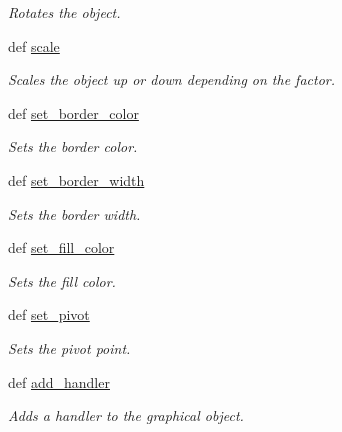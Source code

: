 \begin{DoxyCompactItemize}
\begin{DoxyCompactList}\small\item\em Rotates the object. \item\end{DoxyCompactList}\item 
def \hyperlink{classcs110graphics_1_1Fillable_a80d5b6b6d2ebae867dccecb803075749}{scale}
\begin{DoxyCompactList}\small\item\em Scales the object up or down depending on the factor. \item\end{DoxyCompactList}\item 
def \hyperlink{classcs110graphics_1_1Fillable_a2f830be5d970faac97759910d20d68a4}{set\_\-border\_\-color}
\begin{DoxyCompactList}\small\item\em Sets the border color. \item\end{DoxyCompactList}\item 
def \hyperlink{classcs110graphics_1_1Fillable_a09f05462cb2ed38fdccb244340f05b2b}{set\_\-border\_\-width}
\begin{DoxyCompactList}\small\item\em Sets the border width. \item\end{DoxyCompactList}\item 
def \hyperlink{classcs110graphics_1_1Fillable_a4f24c7186c8d057e42a0209eb1d56be7}{set\_\-fill\_\-color}
\begin{DoxyCompactList}\small\item\em Sets the fill color. \item\end{DoxyCompactList}\item 
def \hyperlink{classcs110graphics_1_1Fillable_a2a6066d1a11c0854ff5ee85e7d9ceb54}{set\_\-pivot}
\begin{DoxyCompactList}\small\item\em Sets the pivot point. \item\end{DoxyCompactList}\item 
def \hyperlink{classcs110graphics_1_1GraphicalObject_adb1af0d5a6baae3f9a08d21a3227c49f}{add\_\-handler}
\begin{DoxyCompactList}\small\item\em Adds a handler to the graphical object. \item\end{DoxyCompactList}\item 

\end{DoxyCompactItemize}
